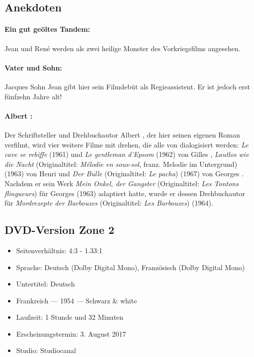 \subsection*{Anekdoten} 

\paragraph{Ein gut geöltes Tandem:} Jean  und René  werden als zwei heilige Monster des Vorkriegsfilms angesehen.
\paragraph{ Vater und Sohn:} Jacques  Sohn Jean gibt hier sein Filmdebüt als Regieassistent. Er ist jedoch erst fünfzehn Jahre alt!
\paragraph{Albert :} Der Schriftsteller und Drehbuchautor Albert , der hier seinen eigenen Roman verfilmt, wird vier weitere Filme mit  drehen, die alle von  dialogisiert werden: \emph{Le cave se rebiffe} (1961) und \emph{Le gentleman d'Epsom} (1962) von Gilles , \emph{Lautlos wie die Nacht} (Originaltitel: \emph{Mélodie en sous-sol}, franz. \glqq{}Melodie im Untergrund\grqq{}) (1963) von Henri  und \emph{Der Bulle} (Originaltitel: \emph{Le pacha}) (1967) von Georges . Nachdem er sein Werk \emph{Mein Onkel, der Gangster} (Originaltitel: \emph{Les Tontons flingueurs}) für Georges  (1963) adaptiert hatte, wurde er dessen Drehbuchautor für \emph{Mordrezepte der Barbouzes} (Originaltitel: \emph{Les Barbouzes}) (1964).

\subsection*{DVD-Version Zone 2}

\begin{itemize}
    \item Seitenverhältnis: 4:3 - 1.33:1
    \item Sprache: Deutsch (Dolby Digital Mono), Französisch (Dolby Digital Mono)
    \item Untertitel: Deutsch
    \item Frankreich --- 1954 --- Schwarz \& white
    \item Laufzeit: 1 Stunde und 32 Minuten
    \item Erscheinungstermin: 3. August 2017
    \item Studio: Studiocanal
\end{itemize}

